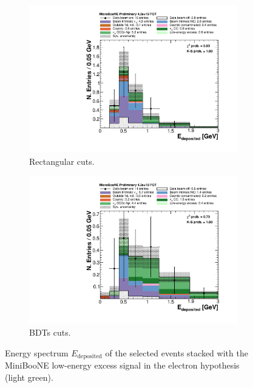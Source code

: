 \begin{figure}[htbp]
  \begin{center}
    \begin{subfigure}{0.48\textwidth}
      \includegraphics[width=\linewidth]{figures/cuts_lee.pdf}
      \caption{Rectangular cuts.} 
    \end{subfigure}\hfill
    \begin{subfigure}{0.48\textwidth}
      \includegraphics[width=\linewidth]{figures/bdt_lee.pdf}
      \caption{BDTs cuts.}  
    \end{subfigure}
    \caption{Energy spectrum $E_{\mathrm{deposited}}$ of the selected events stacked with the MiniBooNE low-energy excess signal in the electron hypothesis (light green).} \label{fig:lee_after}
	\end{center}
\end{figure}


